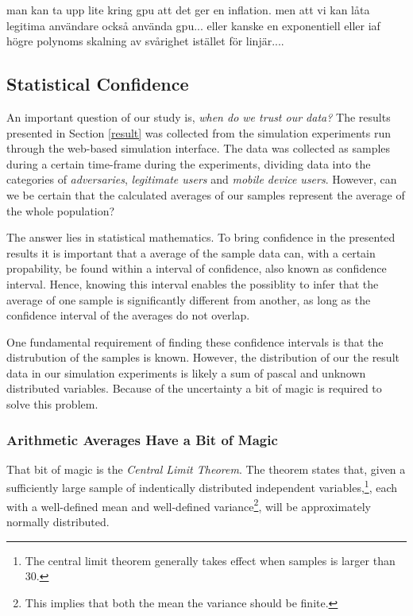 man kan ta upp lite kring gpu att det ger en inflation. men att vi kan låta legitima användare också använda gpu... eller kanske en exponentiell eller iaf högre polynoms skalning av svårighet istället för linjär....



\subsection{Statistical Confidence}
An important question of our study is, \emph{when do we trust our data?} The results presented in Section \ref{result} was collected from the simulation experiments run through the web-based simulation interface. The data was collected as samples during a certain time-frame during the experiments, dividing data into the categories of \emph{adversaries}, \emph{legitimate users} and \emph{mobile device users}. However,  can we be certain that the calculated averages of our samples represent the average of the whole population?

The answer lies in statistical mathematics. To bring confidence in the presented results it is important that a average of the sample data can, with a certain propability, be found within a interval of confidence, also known as confidence interval. Hence, knowing this interval enables the possiblity to infer that the average of one sample is significantly different from another, as long as the confidence interval of the averages do not overlap.

One fundamental requirement of finding these confidence intervals is that the distrubution of the samples is known. However, the distribution of our the result data in our simulation experiments is likely a sum of pascal and unknown distributed variables. Because of the uncertainty a bit of magic is required to solve this problem. 

\subsubsection{Arithmetic Averages Have a Bit of Magic}
That bit of magic is the \emph{Central Limit Theorem}. The theorem states that, given a sufficiently large sample of indentically distributed independent variables,\footnote{The central limit theorem generally takes effect when samples is larger than 30.}, each with a well-defined mean and well-defined variance\footnote{This implies that both the mean the variance should be finite.}, will be approximately normally distributed\cite{gunnar}.

